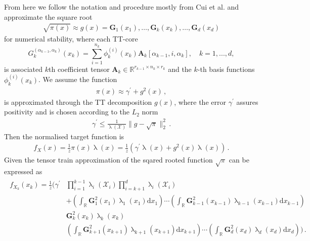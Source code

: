 From here we follow the notation and procedure mostly from Cui et al. \cite{cui2022deep} and approximate the square root
\begin{align}
	\sqrt{\pi(x)} \approx g(x) = \bm{G}_1(x_1), \dots ,  \bm{G}_k(x_k), \dots ,  \bm{G}_d(x_d)
\end{align}
for numerical stability, where each TT-core
\begin{equation}
	G^{(\alpha_{k-1},\alpha_k)}_k(x_k) = \sum_{i=1}^{n_k} \phi^{(i)}_k(x_k) \bm{A}_k[\alpha_{k-1}, i, \alpha_k], \quad k = 1, ..., d,
\end{equation}
is associated $k$th coefficient tensor $\bm{A}_k \in \mathbb{R}^{r_{k-1} \times n_k \times r_k}$ and the $k$-th  basis functions $\phi^{(i)}_k(x_k)$.
We assume the function
\begin{align}
	\pi(x) \approx \gamma^{\prime} + g^2(x) \, ,
\end{align} 
is approximated through the TT decomposition $g(x)$, where the error $\gamma^{\prime}$ assures positivity and is chosen according to the $L_2$ norm 
\begin{align}
	\gamma^{\prime} \leq \frac{1}{\uplambda( \mathcal{X})} \lVert g - \sqrt{\pi}\rVert^2_2 \, .
\end{align}
Then the normalised target function is
\begin{align}
	f_X(x) = \frac{1}{z} \pi(x) \uplambda(x) = \frac{1}{z} ( \gamma^{\prime} \uplambda(x) + g^2(x) \uplambda(x)) \, .
\end{align} 
Given the tensor train approximation of the sqared rooted function $\sqrt{\pi}$ can be expressed as
\begin{align}
	\begin{split}
		f_{X_k}(x_k) = \frac{1}{z}  \Bigg( \gamma^{\prime}& \prod_{i=1}^{k-1} \uplambda_i(\mathcal{X}_i) \prod_{i=k+1}^{d} \uplambda_i(\mathcal{X}_i) \\&+  \left( \int_{\mathbb{R}} \bm{G}^2_{1}(x_1) \uplambda_1(x_1)\text{d}x_{1} \right) \cdots \left( \int_{\mathbb{R}} \bm{G}^2_{k-1}(x_{k-1}) \uplambda_{k-1}(x_{k-1}) \text{d}x_{k-1} \right) \\ & \bm{G}^2_{k}(x_k)\uplambda_k(x_{k})\\ & \left( \int_{\mathbb{R}}  \bm{G}^2_{k+1}(x_{k+1})\uplambda_{k+1}(x_{k+1})\text{d}x_{k+1} \right) \cdots  \left( \int_{\mathbb{R}} \bm{G}^2_{d}(x_d)\uplambda_d(x_{d})\text{d}x_d \right) \Bigg) \, .
	\end{split} 
\end{align}

